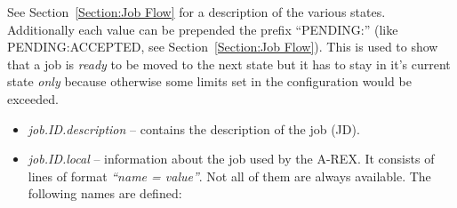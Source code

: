 \documentclass{article}                            %
\begin{document}
See Section~\ref{Section:Job Flow} for a description of the various
states. Additionally each value can be prepended the prefix {}``PENDING:''
(like PENDING:ACCEPTED, see Section~\ref{Section:Job Flow}). This
is used to show that a job is \emph{ready} to be moved to the next
state but it has to stay in it's current state \emph{only} because
otherwise some limits set in the configuration would be exceeded.

\begin{itemize}
\item \textit{job.ID.description} -- contains the description of the job
(JD).
\item \textit{job.ID.local} -- information about the job used by the A-REX.
It consists of lines of format \textit{{}``name = value''}. Not
all of them are always available. The following names are defined:


\end{itemize}
\end{document}
